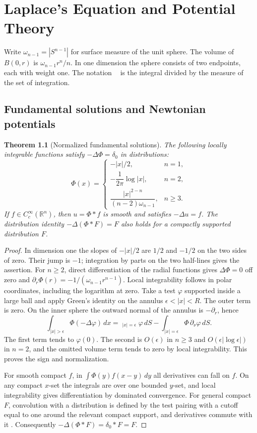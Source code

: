 \documentclass[11pt,oneside,openany]{book}
\newcommand{\dashint}{\mathop{\overline{\int}}\nolimits}
\theoremstyle{plain}
\newtheorem{theorem}{Theorem}[chapter]
\theoremstyle{definition}
\theoremstyle{remark}
\begin{document}
\chapter{Laplace's Equation and Potential Theory}
\label{chap:pde-potential}

Write \(\omega_{n-1}=|S^{n-1}|\) for surface measure of the
unit sphere. The volume of \(B(0,r)\) is
\(\omega_{n-1}r^n/n\). In one dimension the sphere consists of
two endpoints, each with weight one. The notation \(\dashint\)
is the integral divided by the measure of the set of integration.

\section{Fundamental solutions and Newtonian potentials}
\label{pde:L01}

\begin{theorem}[Normalized fundamental solutions]
\label{thm:pde-laplace-fundamental}
The following locally integrable functions satisfy
\(-\Delta\Phi=\delta_0\) in distributions:
\[
 \Phi(x)=
 \begin{cases}
  -|x|/2, & n=1,\\
  -\dfrac1{2\pi}\log|x|, & n=2,\\[1mm]
  \dfrac{|x|^{2-n}}{(n-2)\omega_{n-1}}, & n\ge3.
 \end{cases}
\]
If \(f\in C_c^\infty(\mathbb R^n)\), then \(u=\Phi*f\) is smooth
and satisfies \(-\Delta u=f\). The distribution identity
\(-\Delta(\Phi*F)=F\) also holds for a compactly supported
distribution \(F\).
\end{theorem}
\begin{proof}
In dimension one the slopes of \(-|x|/2\) are \(1/2\) and
\(-1/2\) on the two sides of zero. Their jump is \(-1\);
integration by parts on the two half-lines gives the assertion.
For \(n\ge2\), direct differentiation of the radial functions
gives \(\Delta\Phi=0\) off zero and
\(\partial_r\Phi(r)=-1/(\omega_{n-1}r^{n-1})\).
Local integrability follows in polar coordinates, including
the logarithm at zero. Take a test \(\varphi\) supported inside
a large ball and apply Green's identity on the annulus
\(\epsilon<|x|<R\). The outer term is zero. On the inner sphere
the outward normal of the annulus is \(-\partial_r\), hence
\[
 \int_{|x|>\epsilon}\Phi(-\Delta\varphi)\,dx
 =\dashint_{|x|=\epsilon}\varphi\,dS
      -\int_{|x|=\epsilon}\Phi\,\partial_\nu\varphi\,dS.
\]
The first term tends to \(\varphi(0)\). The second is
\(O(\epsilon)\) in \(n\ge3\) and \(O(\epsilon|\log\epsilon|)\)
in \(n=2\), and the omitted volume term tends to zero by local
integrability. This proves the sign and normalization.

For smooth compact \(f\), in
\(\int\Phi(y)f(x-y)\,dy\) all derivatives can fall on \(f\).
On any compact \(x\)-set the integrals are over one bounded
\(y\)-set, and local integrability gives differentiation
by dominated convergence. For general compact \(F\),
convolution with a distribution is defined by the test pairing
with a cutoff equal to one around the relevant compact support,
and derivatives commute with it \cite[Unit U4]{P102}.
Consequently \(-\Delta(\Phi*F)=\delta_0*F=F\).
\end{proof}
\end{document}
